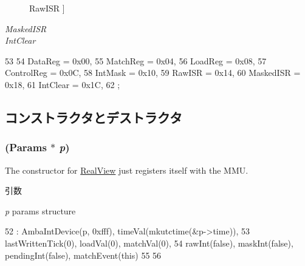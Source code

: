 \begin{Desc}
\begin{description}
{\hypertarget{classPL031_ac205be2172292384dd687b5471a87eddabd636a57d30c6af5f7a2eabb4e4258cd}{
RawISR}
\label{classPL031_ac205be2172292384dd687b5471a87eddabd636a57d30c6af5f7a2eabb4e4258cd}
}]\item[{\em 
\hypertarget{classPL031_ac205be2172292384dd687b5471a87edda84e908ced233cc8a35eabafa2c2acf93}{
MaskedISR}
\label{classPL031_ac205be2172292384dd687b5471a87edda84e908ced233cc8a35eabafa2c2acf93}
}]\item[{\em 
\hypertarget{classPL031_ac205be2172292384dd687b5471a87eddadba6b9695c70b08e0a47bf9b1c0eaeab}{
IntClear}
\label{classPL031_ac205be2172292384dd687b5471a87eddadba6b9695c70b08e0a47bf9b1c0eaeab}
}]\end{description}
\end{Desc}




\begin{DoxyCode}
53          {
54         DataReg    = 0x00,
55         MatchReg   = 0x04,
56         LoadReg    = 0x08,
57         ControlReg = 0x0C,
58         IntMask    = 0x10,
59         RawISR     = 0x14,
60         MaskedISR  = 0x18,
61         IntClear   = 0x1C,
62     };
\end{DoxyCode}


\subsection{コンストラクタとデストラクタ}
\hypertarget{classPL031_a2806576b9665b3919c8528247f5b8687}{
\subsubsection[{PL031}]{ ({\bf Params} $\ast$ {\em p})}}
\label{classPL031_a2806576b9665b3919c8528247f5b8687}
The constructor for \hyperlink{classRealView}{RealView} just registers itself with the MMU. 
\begin{DoxyParams}{引数}
\item[{\em p}]params structure \end{DoxyParams}



\begin{DoxyCode}
52     : AmbaIntDevice(p, 0xfff), timeVal(mkutctime(&p->time)),
53       lastWrittenTick(0), loadVal(0), matchVal(0),
54       rawInt(false), maskInt(false), pendingInt(false), matchEvent(this)
55 {
56 }
\end{DoxyCode}


